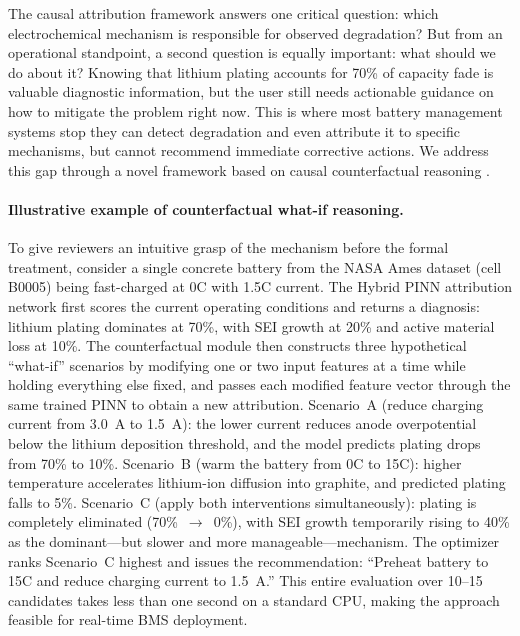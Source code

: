 \documentclass[5p,times,authoryear]{elsarticle}
\begin{document}
The causal attribution framework answers one critical question: which electrochemical mechanism is responsible for observed degradation? But from an operational standpoint, a second question is equally important: what should we do about it? Knowing that lithium plating accounts for 70\% of capacity fade is valuable diagnostic information, but the user still needs actionable guidance on how to mitigate the problem right now. This is where most battery management systems stop they can detect degradation and even attribute it to specific mechanisms, but cannot recommend immediate corrective actions. We address this gap through a novel framework based on causal counterfactual reasoning \citep{pearl2009causality,peters2017elements}.

\paragraph{Illustrative example of counterfactual what-if reasoning.}
To give reviewers an intuitive grasp of the mechanism before the formal treatment, consider a single concrete battery from the NASA Ames dataset (cell B0005) being fast-charged at 0\textdegree{}C with 1.5C current. The Hybrid PINN attribution network first scores the current operating conditions and returns a diagnosis: lithium plating dominates at 70\%, with SEI growth at 20\% and active material loss at 10\%. The counterfactual module then constructs three hypothetical ``what-if'' scenarios by modifying one or two input features at a time while holding everything else fixed, and passes each modified feature vector through the same trained PINN to obtain a new attribution. Scenario~A (reduce charging current from 3.0~A to 1.5~A): the lower current reduces anode overpotential below the lithium deposition threshold, and the model predicts plating drops from 70\% to 10\%. Scenario~B (warm the battery from 0\textdegree{}C to 15\textdegree{}C): higher temperature accelerates lithium-ion diffusion into graphite, and predicted plating falls to 5\%. Scenario~C (apply both interventions simultaneously): plating is completely eliminated (70\%~$\rightarrow$~0\%), with SEI growth temporarily rising to 40\% as the dominant---but slower and more manageable---mechanism. The optimizer ranks Scenario~C highest and issues the recommendation: ``Preheat battery to 15\textdegree{}C and reduce charging current to 1.5~A.'' This entire evaluation over 10--15 candidates takes less than one second on a standard CPU, making the approach feasible for real-time BMS deployment.
\end{document}
